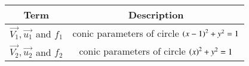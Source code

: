 \begin{tabular}[12ptx]{ |c| c|}
\hline\textbf{Term} & \textbf{Description}\\
\hline
$\vec{V_{1}},\vec{u_{1}}$ and $f_{1}$&conic parameters of circle $\left(x-1\right)^{2} +y^{2} = 1$ \\
\hline
$\vec{V_{2}},\vec{u_{2}}$ and $f_{2}$&conic parameters of circle $\left(x\right)^{2} +y^{2} = 1$ \\
\hline
\end{tabular}